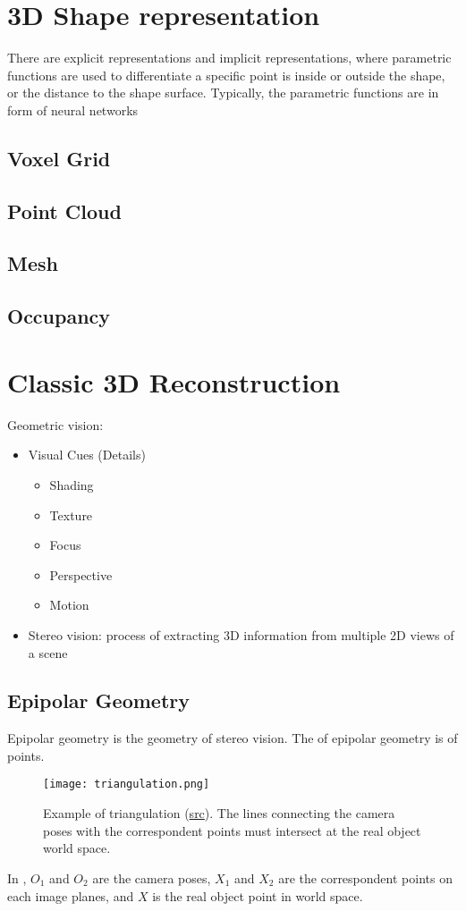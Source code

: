 \section{3D Shape representation}
There are explicit representations and implicit representations, where parametric functions are used to differentiate a specific point is inside or outside the shape, or the distance to the shape surface. Typically, the parametric functions are in form of neural networks
\subsection{Voxel Grid}
\subsection{Point Cloud}
\subsection{Mesh}

\subsection{Occupancy}

\section{Classic 3D Reconstruction}
Geometric vision:
\begin{itemize}
	\item Visual Cues (Details)
	\begin{itemize}
		\item Shading
		\item Texture
		\item Focus
		\item Perspective
		\item Motion		
	\end{itemize}
	\item Stereo vision: process of extracting 3D information from multiple 2D views of a scene
\end{itemize}

\subsection{Epipolar Geometry}
Epipolar geometry is the geometry of stereo vision. The  of epipolar geometry is  of points.
\begin{figure}[hbt!]
	\centering
	\texttt{[image: triangulation.png]}
	\caption{Example of triangulation (\href{https://homepages.inf.ed.ac.uk/rbf/CVonline/LOCAL_COPIES/OWENS/LECT10/node3.html}{src}). The lines connecting the camera poses with the correspondent points must intersect at the real object world space.}
	\label{fig:triangulation}
\end{figure}
In , $O_1$ and $O_2$ are the camera poses, $X_1$ and $X_2$ are the correspondent points on each image planes, and $X$ is the real object point in world space.

